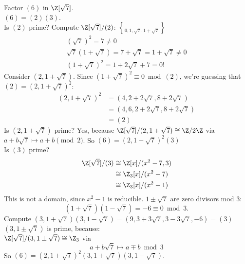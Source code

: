 \eg Factor $(6)$ in $\Z[\sqrt7]$. \\
\soln $(6)=(2)(3)$. \\
Is $(2)$ prime?  Compute $\Z[\sqrt7]/(2)$: $\brace{0,1,\sqrt7,1+\sqrt7}$
\begin{gather*}
(\sqrt7)^2 = 7 \neq 0 \\
\sqrt7(1+\sqrt7) = 7 + \sqrt7 = 1 + \sqrt7 \neq 0 \\
(1+\sqrt7)^2 = 1 + 2\sqrt7 + 7 = 0 !
\end{gather*}
Consider $(2,1+\sqrt7)$.  Since $(1+\sqrt7)^2\equiv0\bmod(2)$, we're guessing that $(2)=(2,1+\sqrt7)^2$:
\begin{align*}
(2,1+\sqrt7)^2 &= (4,2+2\sqrt7,8+2\sqrt7) \\
&= (4,6,2+2\sqrt7,8+2\sqrt7) \\
&= (2)
\end{align*}
Is $(2,1+\sqrt7)$ prime?  Yes, because $\Z[\sqrt7]/(2,1+\sqrt7)\cong\Z/2\Z$ via $a+b\sqrt7\mapsto a+b\pmod2$.
So $(6)=(2,1+\sqrt7)^2(3)$ \\
Is $(3)$ prime?
\begin{align*}
\Z[\sqrt7]/(3) &\cong \Z[x]/(x^2-7,3) \\
&\cong \Z_3[x]/(x^2-7) \\
&\cong \Z_3[x]/(x^2-1)
\end{align*}
This is not a domain, since $x^2-1$ is reducible.
$1\pm\sqrt7$ are zero divisors mod $3$:
\[ (1+\sqrt7)(1-\sqrt7) = -6 \equiv 0 \bmod 3 . \]
Compute $(3,1+\sqrt7)(3,1-\sqrt7)=(9,3+3\sqrt7,3-3\sqrt7,-6)=(3)$ \\
$(3,1\pm\sqrt7)$ is prime, because: \\
$\Z[\sqrt7]/(3,1\pm\sqrt7)\cong\Z_3$ via
\[ a + b \sqrt7 \mapsto a \mp b \bmod 3 \]
So $(6)=(2,1+\sqrt7)^2(3,1+\sqrt7)(3,1-\sqrt7)$.
